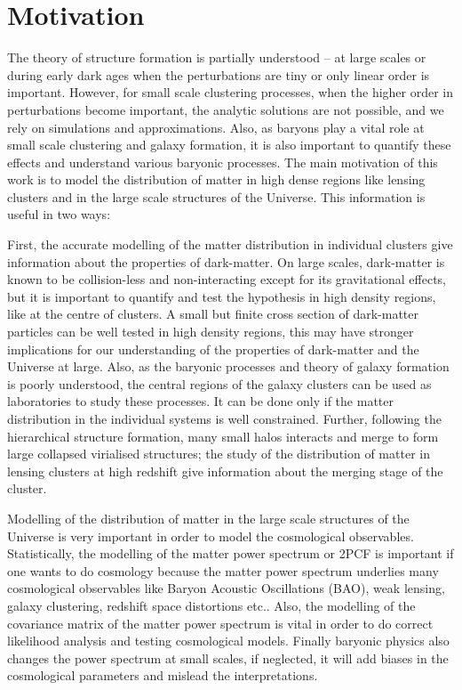 

\section{Motivation}

The theory of structure formation is partially understood --  at large scales 
or during early dark ages when the perturbations are tiny or only linear order is important. 
However, for small scale clustering processes, when the higher order in perturbations 
become important, the analytic solutions are not possible, and we rely on simulations and 
approximations. Also, as baryons play a vital role at small scale clustering
and galaxy formation, it is also important to quantify these effects and 
understand various baryonic processes. 
The main motivation of this work is to model the distribution of matter in high dense
regions like lensing clusters and in the large scale structures of the Universe. 
This information is useful in two ways: 

First, the accurate modelling of the matter distribution in individual clusters
give information about the properties of dark-matter. On large scales, dark-matter
is known to be collision-less and non-interacting except for its gravitational effects,
but it is important to quantify and test the hypothesis in high density regions, like
at the centre of clusters. A small but finite cross section of dark-matter particles
can be well tested in high density regions, this may have stronger implications for our 
understanding of the properties of dark-matter and the Universe at large.  
Also, as the baryonic processes and theory of galaxy
formation is poorly understood, the central regions of the galaxy clusters can be 
used as laboratories to study these processes. It can be done only if the matter 
distribution in the individual systems is well constrained. 
Further, following the hierarchical structure formation, many small halos interacts and
merge to form large collapsed virialised structures; the study of the distribution of 
matter in lensing clusters at high redshift give information about the merging
stage of the cluster. 

Modelling of the distribution of matter in the large scale structures of the  
Universe is very important
in order to model the cosmological observables. Statistically, the modelling of the
matter power spectrum or 2PCF is important if one wants to do cosmology because 
the matter power spectrum underlies many
cosmological observables like Baryon Acoustic Oscillations (BAO), 
weak lensing, galaxy clustering, redshift
space distortions etc.. Also, the modelling of the 
covariance matrix of the matter power spectrum is vital in order to do correct
likelihood analysis and testing cosmological models. Finally baryonic physics 
also changes the power spectrum at small scales, if neglected, it will add biases
in the cosmological parameters and mislead the interpretations. 

